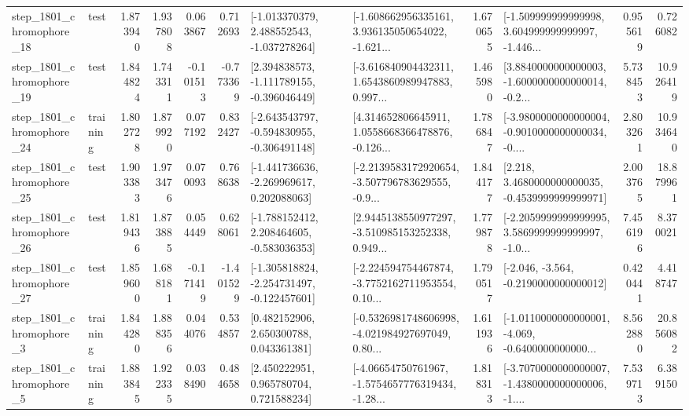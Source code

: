 \begin{tabular}{llrrrrllrlrr}
 step\_1801\_chromophore\_18 &      test &      1.873940 &    1.937808 &      0.063867 &  0.712693 &   [-1.013370379, 2.488552543, -1.037278264] &  [-1.608662956335161, 3.936135050654022, -1.621... &       1.670655 &  [-1.509999999999998, 3.604999999999997, -1.446... &            0.955619 &          0.726082 \\
 step\_1801\_chromophore\_19 &      test &      1.844824 &    1.743311 &     -0.101513 & -0.773369 &   [2.394838573, -1.111789155, -0.396046449] &  [-3.616840904432311, 1.6543860989947883, 0.997... &       1.465980 &  [3.8840000000000003, -1.6000000000000014, -0.2... &            5.738453 &         10.926419 \\
 step\_1801\_chromophore\_24 &  training &      1.802728 &    1.879920 &      0.077192 &  0.832427 &  [-2.643543797, -0.594830955, -0.306491148] &  [4.314652806645911, 1.0558668366478876, -0.126... &       1.786847 &  [-3.9800000000000004, -0.9010000000000034, -0.... &            2.803261 &         10.934640 \\
 step\_1801\_chromophore\_25 &      test &      1.903383 &    1.973476 &      0.070093 &  0.768638 &   [-1.441736636, -2.269969617, 0.202088063] &  [-2.2139583172920654, -3.507796783629555, -0.9... &       1.844177 &   [2.218, 3.4680000000000035, -0.4539999999999971] &            2.003765 &         18.879961 \\
 step\_1801\_chromophore\_26 &      test &      1.819436 &    1.873885 &      0.054449 &  0.628061 &   [-1.788152412, 2.208464605, -0.583036353] &  [2.9445138550977297, -3.510985153252338, 0.949... &       1.779878 &  [-2.2059999999999995, 3.5869999999999997, -1.0... &            7.456196 &          8.370021 \\
 step\_1801\_chromophore\_27 &      test &      1.859600 &    1.688181 &     -0.171419 & -1.401529 &  [-1.305818824, -2.254731497, -0.122457601] &  [-2.224594754467874, -3.7752162711953554, 0.10... &       1.790517 &              [-2.046, -3.564, -0.2190000000000012] &            0.420441 &          4.418747 \\
  step\_1801\_chromophore\_3 &  training &      1.844280 &    1.888356 &      0.044076 &  0.534857 &     [0.482152906, 2.650300788, 0.043361381] &  [-0.5326981748606998, -4.021984927697049, 0.80... &       1.611936 &  [-1.0110000000000001, -4.069, -0.6400000000000... &            8.562880 &         20.856082 \\
  step\_1801\_chromophore\_5 &  training &      1.883845 &    1.922335 &      0.038490 &  0.484658 &     [2.450222951, 0.965780704, 0.721588234] &  [-4.06654750761967, -1.5754657776319434, -1.28... &       1.818313 &  [-3.7070000000000007, -1.4380000000000006, -1.... &            7.539713 &          6.389150 \\

\end{tabular}
